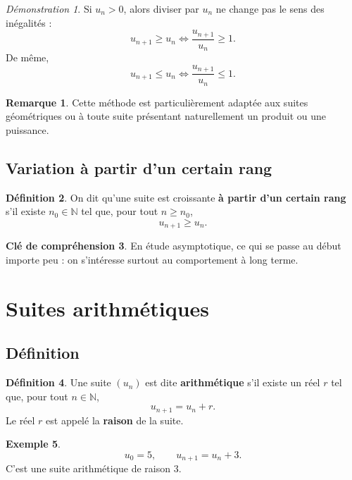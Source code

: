 \documentclass[11pt,a4paper]{article}
\theoremstyle{definition}
\newtheorem{definition}{Définition}[section]
\newtheorem{exemple}[definition]{Exemple}
\newtheorem{remarque}[definition]{Remarque}
\newtheorem{interpretation}[definition]{Clé de compréhension}
\theoremstyle{plain}
\theoremstyle{remark}
\newtheorem*{demonstrationlibre}{Démonstration}
\newcommand{\N}{\mathbb{N}}
\begin{document}
\begin{demonstrationlibre}
Si $u_n>0$, alors diviser par $u_n$ ne change pas le sens des inégalités :
\[
u_{n+1}\geq u_n\iff \frac{u_{n+1}}{u_n}\geq1.
\]
De même,
\[
u_{n+1}\leq u_n\iff \frac{u_{n+1}}{u_n}\leq1.
\]
\end{demonstrationlibre}

\begin{remarque}
Cette méthode est particulièrement adaptée aux suites géométriques ou à toute suite présentant naturellement un produit ou une puissance.
\end{remarque}

\subsection{Variation à partir d'un certain rang}

\begin{definition}
On dit qu'une suite est croissante \textbf{à partir d'un certain rang} s'il existe $n_0\in\N$ tel que, pour tout $n\geq n_0$,
\[
u_{n+1}\geq u_n.
\]
\end{definition}

\begin{interpretation}
En étude asymptotique, ce qui se passe au début importe peu : on s'intéresse surtout au comportement à long terme.
\end{interpretation}

\section{Suites arithmétiques}

\subsection{Définition}

\begin{definition}
Une suite $(u_n)$ est dite \textbf{arithmétique} s'il existe un réel $r$ tel que, pour tout $n\in\N$,
\[
u_{n+1}=u_n+r.
\]
Le réel $r$ est appelé la \textbf{raison} de la suite.
\end{definition}

\begin{exemple}
\[
u_0=5,\qquad u_{n+1}=u_n+3.
\]
C'est une suite arithmétique de raison $3$.
\end{exemple}
\end{document}
